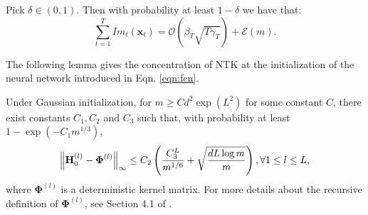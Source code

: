 \begin{auxlemma}
\label{lemma:neural_cbo_improvement_f}
    Pick $\delta \in (0, 1)$. Then with probability at least $1 - \delta$ we have that:
    \[ \sum_{t=1}^T {Im}_t (\mathbf{x}_t) = \mathcal{O}(\beta_T \sqrt{T\gamma_T} ) + \mathcal{E}(m). \]
\end{auxlemma}

The following lemma gives the concentration of NTK at the initialization of the neural network introduced in Eqn. \ref{eqn:fcn}.
\begin{auxlemma}
\label{lemma:neural_cbo_H_to_Phi}
Under Gaussian initialization, for $m \ge Cd^2 \exp(L^2)$ for some constant $C$, there exist constants $C_1, C_2$ and $C_3$ such that, with probability at least $1 - \exp (-C_1 m^{1/3})$,
\[
\norm{\mathbf{H}^{(l)}_0 - \boldsymbol{\Phi}^{(l)}}_\infty \le C_2 \left(\frac{C_3^L}{m^{1/6}} + \sqrt{\frac{dL\log m}{m}}\right), \forall 1\le l \le L,
\]
where $\boldsymbol{\Phi}^{(l)}$ is a deterministic kernel matrix. For more details about the recursive definition of $\boldsymbol{\Phi}^{(l)}$, see Section 4.1 of \citet{xu2024overparametrized}.
\end{auxlemma}

